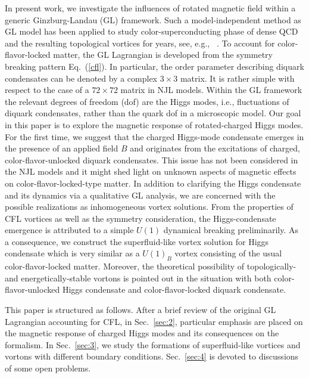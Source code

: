 \documentclass[12pt]{article}
\begin{document}
In present work, we investigate the influences of rotated magnetic field within a generic Ginzburg-Landau (GL)
framework. Such a model-independent method as GL model has been applied to study color-superconducting phase
of dense QCD and the resulting topological vortices for years, see, e.g., ~\cite{giannakis2002ginzburg,iida2002superfluid,balachandran2006semisuperfluid,nakano2008non,eto2014vortices,zhang2015magnetic}.
To account for color-flavor-locked matter, the GL Lagrangian is developed from the symmetry breaking pattern Eq.~(\ref{cfl}).
In particular, the order parameter describing diquark condensates can be denoted by a complex $3\times3$ matrix.
It is rather simple with respect to the case of a $72 \times 72$ matrix in NJL models. Within the GL framework
the relevant degrees of freedom (dof) are the Higgs modes, i.e., fluctuations of diquark condensates, rather than
the quark dof in a microscopic model.
Our goal in this paper is to explore the magnetic response of rotated-charged Higgs modes.
For the first time, we suggest that the charged Higgs-mode condensate emerges in the presence of an applied field $B$ and originates
from the excitations of charged, color-flavor-unlocked diquark condensates. This issue has not been considered in the NJL
models and it might shed light on unknown aspects of magnetic effects on color-flavor-locked-type matter.
In addition to clarifying the Higgs condensate and its dynamics via a qualitative GL analysis, we are concerned with the
possible realizations as inhomogeneous vortex solutions. From the properties of CFL vortices as well as the symmetry
consideration, the Higgs-condensate emergence is attributed to a simple $U(1)$ dynamical breaking preliminarily.
As a consequence, we construct the superfluid-like vortex solution for Higgs condensate which is very similar as
a $U(1)_B$ vortex consisting of the usual color-flavor-locked matter.
Moreover, the theoretical possibility of topologically- and energetically-stable vortons is pointed out in the
situation with both color-flavor-unlocked Higgs condensate and color-flavor-locked diquark condensate.

This paper is structured as follows. After a brief review of the original GL Lagrangian accounting for CFL, in
Sec.~\ref{sec:2}, particular emphasis are placed on the magnetic response of charged Higgs modes and its
consequences on the formalism. In Sec.~\ref{sec:3}, we study the formations of superfluid-like vortices and vortons
with different boundary conditions. Sec.~\ref{sec:4} is devoted to discussions of some open problems.
\end{document}
